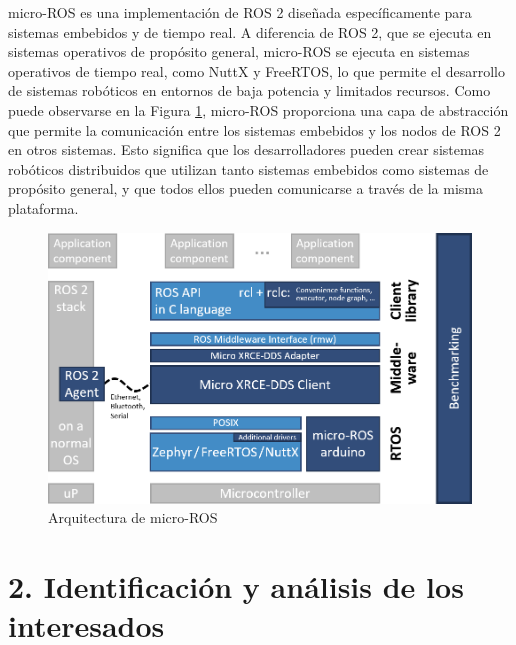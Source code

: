 \documentclass[
11pt, %
codirector, %
]{charter}
\begin{document}
micro-ROS es una implementación de ROS 2 diseñada específicamente para sistemas embebidos y de tiempo real. A diferencia de ROS 2, que se ejecuta en sistemas operativos de propósito general, micro-ROS se ejecuta en sistemas operativos de tiempo real, como NuttX y FreeRTOS, lo que permite el desarrollo de sistemas robóticos en entornos de baja potencia y limitados recursos. Como puede observarse en la Figura \ref{fig:microROSarch}, micro-ROS proporciona una capa de abstracción que permite la comunicación entre los sistemas embebidos y los nodos de ROS 2 en otros sistemas. Esto significa que los desarrolladores pueden crear sistemas robóticos distribuidos que utilizan tanto sistemas embebidos como sistemas de propósito general, y que todos ellos pueden comunicarse a través de la misma plataforma.

\begin{figure}[htpb]
\centering 
\includegraphics[width=.7\textwidth]{./Figuras/micro-ROS_architecture.png}
\caption{Arquitectura de micro-ROS}
\label{fig:microROSarch}
\end{figure}

\section{2. Identificación y análisis de los interesados}
\label{sec:interesados}

 
 
\end{document}

